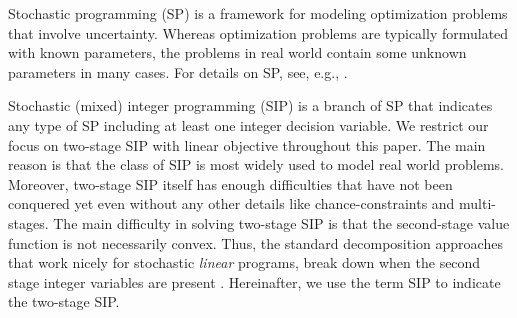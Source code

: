 Stochastic programming (SP) is a framework for modeling optimization problems that involve uncertainty. Whereas optimization problems are typically formulated with known parameters, the problems in real world contain some unknown parameters in many cases. For details on SP, see, e.g., \cite{web:SPS,book:BL2011}. 

Stochastic (mixed) integer programming (SIP) is a branch of SP that indicates any type of SP including at least one integer decision variable. We restrict our focus on two-stage SIP with linear objective throughout this paper. The main reason is that the class of SIP is most widely used to model real world problems. Moreover, two-stage SIP itself has enough difficulties that have not been conquered yet even without any other details like chance-constraints and multi-stages. The main difficulty in solving two-stage SIP is that the second-stage value function is not necessarily convex. Thus, the standard decomposition approaches that work nicely for stochastic \textit{linear} programs, break down when the second stage integer variables are present \cite{journal:AG2004}. Hereinafter, we use the term SIP to indicate the two-stage SIP. 






